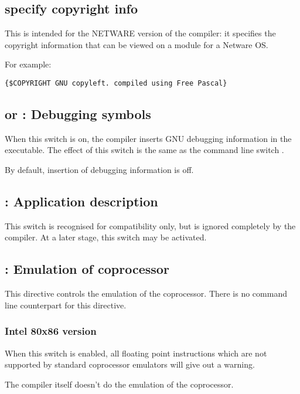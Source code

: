 \subsection{ specify copyright info}
This is intended for the NETWARE version of the compiler: it specifies the
copyright information that can be viewed on a module for a Netware OS.

For example:
\begin{verbatim}
{$COPYRIGHT GNU copyleft. compiled using Free Pascal}
\end{verbatim}


\subsection{ or  : Debugging symbols}

When this switch is on,
the compiler inserts GNU debugging information in
the executable. The effect of this switch is the same as the command line
switch .

By default, insertion of debugging information is off.

\subsection{ : Application description}

This switch is recognised for compatibility only, but is ignored completely
by the compiler. At a later stage, this switch may be activated.

\subsection{ : Emulation of coprocessor}

This directive controls the emulation of the coprocessor. There is no
command line counterpart for this directive.

\subsubsection{Intel 80x86 version}

When this switch is enabled, all floating point instructions
which are not supported by standard coprocessor emulators will give out
a warning.

The compiler itself doesn't do the emulation of the coprocessor.

